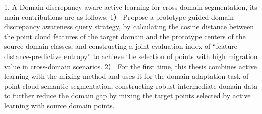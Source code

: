 1. A Domain discrepancy aware active learning for cross-domain segmentation, its main contributions are as follows: 
1） Propose a prototype-guided domain discrepancy awareness query strategy, by calculating the cosine distance between the point cloud features of the target domain and the prototype centers of the source domain classes, and constructing a joint evaluation index of “feature distance-predictive entropy” to achieve the selection of points with high migration value in cross-domain scenarios. 
2） For the first time, this thesis combines active learning with the mixing method and uses it for the domain adaptation task of point cloud semantic segmentation, constructing robust intermediate domain data to further reduce the domain gap by mixing the target points selected by active learning with source domain points.

